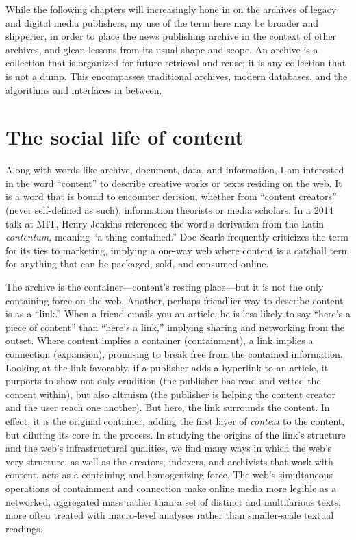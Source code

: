 While the following chapters will increasingly hone in on the archives of legacy and digital media publishers, my use of the term here may be broader and slipperier, in order to place the news publishing archive in the context of other archives, and glean lessons from its usual shape and scope. An archive is a collection that is organized for future retrieval and reuse; it is any collection that is not a dump. This encompasses traditional archives, modern databases, and the algorithms and interfaces in between.

\section{The social life of content}

Along with words like archive, document, data, and information, I am interested in the word ``content'' to describe creative works or texts residing on the web. It is a word that is bound to encounter derision, whether from ``content creators'' (never self-defined as such), information theorists or media scholars. In a 2014 talk at MIT, Henry Jenkins referenced the word's derivation from the Latin \emph{contentum}, meaning ``a thing contained.''\autocite{whitacre_henry_????} Doc Searls frequently criticizes the term for its ties to marketing, implying a one-way web where content is a catchall term for anything that can be packaged, sold, and consumed online.\autocite{searls_earth_2014}

The archive is the container---content's resting place---but it is not the only containing force on the web. Another, perhaps friendlier way to describe content is as a ``link.'' When a friend emails you an article, he is less likely to say ``here's a piece of content'' than ``here's a link,'' implying sharing and networking from the outset. Where content implies a container (containment), a link implies a connection (expansion), promising to break free from the contained information. Looking at the link favorably, if a publisher adds a hyperlink to an article, it purports to show not only erudition (the publisher has read and vetted the content within), but also altruism (the publisher is helping the content creator and the user reach one another). But here, the link surrounds the content. In effect, it is the original container, adding the first layer of \emph{context} to the content, but diluting its core in the process. In studying the origins of the link's structure and the web's infrastructural qualities, we find many ways in which the web's very structure, as well as the creators, indexers, and archivists that work with content, acts as a containing and homogenizing force. The web's simultaneous operations of containment and connection make online media more legible as a networked, aggregated mass rather than a set of distinct and multifarious texts, more often treated with macro-level analyses rather than smaller-scale textual readings.

